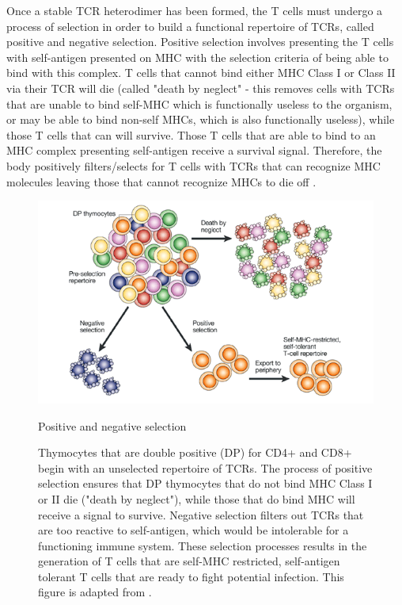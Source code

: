 Once a stable TCR heterodimer has been formed, the T cells must undergo a process of selection in order to build a functional repertoire of TCRs, called positive and negative selection. Positive selection involves presenting the T cells with self-antigen presented on MHC with the selection criteria of being able to bind with this complex.  T cells that cannot bind either MHC Class I or Class II via their TCR will die (called "death by neglect" - this removes cells with TCRs that are unable to bind self-MHC which is functionally useless to the organism, or may be able to bind non-self MHCs, which is also functionally useless), while those T cells that can will survive. Those T cells that are able to bind to an MHC complex presenting self-antigen receive a survival signal. Therefore, the body positively filters/selects for T cells with TCRs that can recognize MHC molecules leaving those that cannot recognize MHCs to die off \cite{Palmer2003}.

\begin{figure}[htbp]
	\centering
	\includegraphics[width=\textwidth]{../figures/chapter1/posnegsel.png}
	\caption{Positive and negative selection}
	\caption*{Thymocytes that are double positive (DP) for CD4+ and CD8+ begin with an unselected repertoire of TCRs. The process of positive selection ensures that DP thymocytes that do not bind MHC Class I or II die ("death by neglect"), while those that do bind MHC will receive a signal to survive. Negative selection filters out TCRs that are too reactive to self-antigen, which would be intolerable for a functioning immune system.  These selection processes results in the generation of T cells that are self-MHC restricted, self-antigen tolerant T cells that are ready to fight potential infection. This figure is adapted from \cite{Palmer2003}.}
	\label{fig:posnegsel}
\end{figure}

